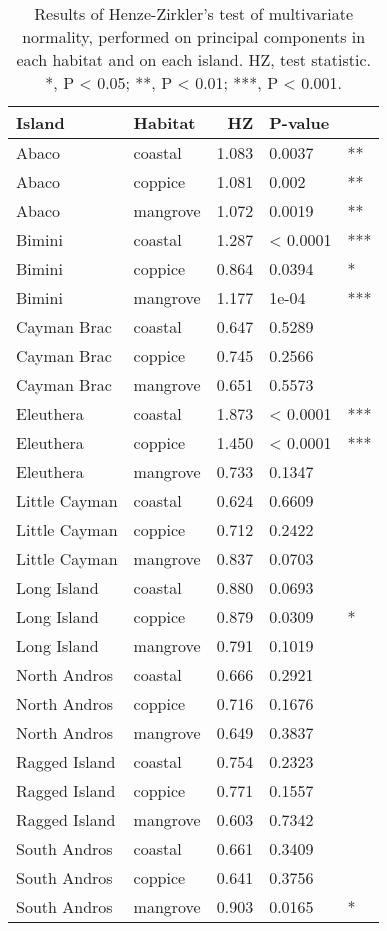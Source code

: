 \begin{table}[H]
    \caption{Results of Henze-Zirkler's test of multivariate normality, performed on principal components in each habitat and on each island. HZ, test statistic. *, P < 0.05; **, P < 0.01; ***, P < 0.001.}
    \centering
    \begin{tabular}{llrll}
        \hline
        Island & Habitat & HZ & P-value & \\
        \hline
        Abaco & coastal & 1.083 & 0.0037 & **\\
        Abaco & coppice & 1.081 & 0.002 & **\\
        Abaco & mangrove & 1.072 & 0.0019 & **\\
        Bimini & coastal & 1.287 & < 0.0001 & ***\\
        Bimini & coppice & 0.864 & 0.0394 & *\\
        Bimini & mangrove & 1.177 & 1e-04 & ***\\
        Cayman Brac & coastal & 0.647 & 0.5289 & \\
        Cayman Brac & coppice & 0.745 & 0.2566 & \\
        Cayman Brac & mangrove & 0.651 & 0.5573 & \\
        Eleuthera & coastal & 1.873 & < 0.0001 & ***\\
        Eleuthera & coppice & 1.450 & < 0.0001 & ***\\
        Eleuthera & mangrove & 0.733 & 0.1347 & \\
        Little Cayman & coastal & 0.624 & 0.6609 & \\
        Little Cayman & coppice & 0.712 & 0.2422 & \\
        Little Cayman & mangrove & 0.837 & 0.0703 & \\
        Long Island & coastal & 0.880 & 0.0693 & \\
        Long Island & coppice & 0.879 & 0.0309 & *\\
        Long Island & mangrove & 0.791 & 0.1019 & \\
        North Andros & coastal & 0.666 & 0.2921 & \\
        North Andros & coppice & 0.716 & 0.1676 & \\
        North Andros & mangrove & 0.649 & 0.3837 & \\
        Ragged Island & coastal & 0.754 & 0.2323 & \\
        Ragged Island & coppice & 0.771 & 0.1557 & \\
        Ragged Island & mangrove & 0.603 & 0.7342 & \\
        South Andros & coastal & 0.661 & 0.3409 & \\
        South Andros & coppice & 0.641 & 0.3756 & \\
        South Andros & mangrove & 0.903 & 0.0165 & *\\
        \hline
    \end{tabular}
    \label{suptab:multinorm}
\end{table}


